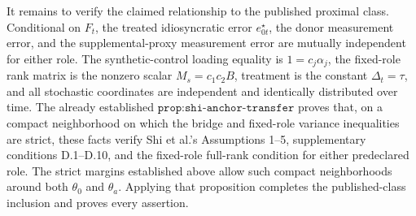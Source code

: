 It remains to verify the claimed relationship to the published proximal class.  Conditional on \(F_t\), the treated idiosyncratic error \(e_{0t}^{\star}\), the donor measurement error, and the supplemental-proxy measurement error are mutually independent for either role.  The synthetic-control loading equality is \(1=c_j\alpha_j\), the fixed-role rank matrix is the nonzero scalar \(M_s=c_1c_2B\), treatment is the constant \(\Delta_t=\tau\), and all stochastic coordinates are independent and identically distributed over time.  The already established \(\texttt{prop:shi-anchor-transfer}\) proves that, on a compact neighborhood on which the bridge and fixed-role variance inequalities are strict, these facts verify Shi et al.'s Assumptions 1--5, supplementary conditions D.1--D.10, and the fixed-role full-rank condition for either predeclared role.  The strict margins established above allow such compact neighborhoods around both \(\theta_0\) and \(\theta_a\).  Applying that proposition completes the published-class inclusion and proves every assertion.
